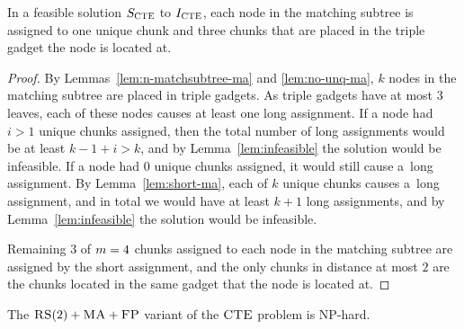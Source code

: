 \begin{lemma}
  In a feasible solution $S_{\mathrm{\textsc{CTE}}}$ to $I_{\mathrm{\textsc{CTE}}}$, each node in the matching subtree is assigned to one unique chunk and three chunks that are placed in the triple gadget the node is located at.
  \label{lem:one-unique-per-node}
\end{lemma}
\begin{proof}
  By Lemmas~\ref{lem:n-matchsubtree-ma} and \ref{lem:no-unq-ma}, $k$ nodes in the matching subtree are placed in triple gadgets.
  As triple gadgets have at most $3$ leaves, each of these nodes causes at least one long assignment.
  If a node had $i>1$ unique chunks assigned, then the total number of long assignments would be at least $k-1+i>k$, and by Lemma~\ref{lem:infeasible} the solution would be infeasible.
  If a node had $0$ unique chunks assigned, it would still cause a~long assignment.
  By Lemma~\ref{lem:short-ma}, each of $k$ unique chunks causes a~long assignment, and in total we would have at least $k+1$ long assignments,  and by Lemma~\ref{lem:infeasible} the solution would be infeasible.

  Remaining $3$ of $m=4$ chunks assigned to each node in the matching subtree are assigned by the short assignment, and the only chunks in distance at most $2$ are the chunks located in the same gadget that the node is located at.
\end{proof}

\begin{theorem}
  The $\textsc{RS}(2)+\textsc{MA}+\textsc{FP}$ variant of the $\textsc{CTE}$ problem is NP-hard.
  \label{th:ma-reduction}
\end{theorem}

